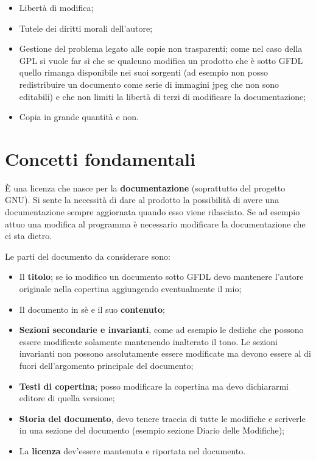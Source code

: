 \begin{itemize}

\item Libertà di modifica;
\item Tutele dei diritti morali dell'autore;
\item Gestione del problema legato alle copie non trasparenti; come nel caso della GPL si vuole far sì che se qualcuno modifica un prodotto che è sotto GFDL quello rimanga disponibile nei suoi sorgenti (ad esempio non posso redistribuire un documento come serie di immagini jpeg che non sono editabili) e che non limiti la libertà di terzi di modificare la documentazione;
\item Copia in grande quantità e non.

\end{itemize}

\section{Concetti fondamentali}

È una licenza che nasce per la \textbf{documentazione} (soprattutto del progetto GNU). Si sente la necessità di dare al prodotto la possibilità di avere una documentazione sempre aggiornata quando esso viene rilasciato. Se ad esempio attuo una modifica al programma è necessario modificare la documentazione che ci sta dietro. 

Le parti del documento da considerare sono:

\begin{itemize}

\item Il \textbf{titolo}; se io modifico un documento sotto GFDL devo mantenere l'autore originale nella copertina aggiungendo eventualmente il mio;
\item Il documento in sè e il suo \textbf{contenuto};
\item \textbf{Sezioni secondarie e invarianti}, come ad esempio le dediche che possono essere modificate solamente mantenendo inalterato il tono. Le sezioni invarianti non possono assolutamente essere modificate ma devono essere al di fuori dell'argomento principale del documento;
\item \textbf{Testi di copertina}; posso modificare la copertina ma devo dichiararmi editore di quella versione;
\item \textbf{Storia del documento}, devo tenere traccia di tutte le modifiche e scriverle in una sezione del documento (esempio sezione Diario delle Modifiche);
\item La \textbf{licenza} dev'essere mantenuta e riportata nel documento.

\end{itemize}

